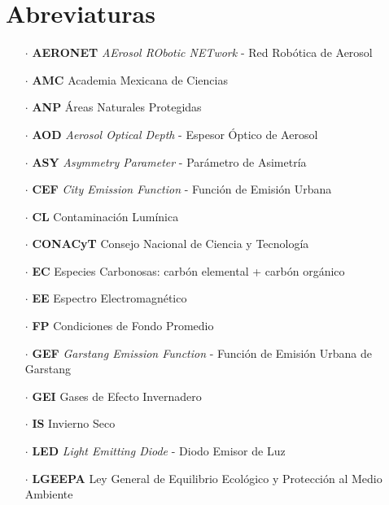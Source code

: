 \chapter{Abreviaturas}

\begin{itemize}

\item[$\cdot$] \textbf{AERONET} \textit{AErosol RObotic NETwork} - Red Robótica de Aerosol

\item[$\cdot$] \textbf{AMC} Academia Mexicana de Ciencias

\item[$\cdot$] \textbf{ANP} Áreas Naturales Protegidas

\item[$\cdot$] \textbf{AOD} \textit{Aerosol Optical Depth} - Espesor Óptico de Aerosol

\item[$\cdot$] \textbf{ASY} \textit{Asymmetry Parameter} - Parámetro de Asimetría

\item[$\cdot$] \textbf{CEF} \textit{City Emission Function} - Función de Emisión Urbana

\item[$\cdot$] \textbf{CL} Contaminación Lumínica

\item[$\cdot$] \textbf{CONACyT} Consejo Nacional de Ciencia y Tecnología

\item[$\cdot$] \textbf{EC} Especies Carbonosas: carbón elemental + carbón orgánico

\item[$\cdot$] \textbf{EE} Espectro Electromagnético

\item[$\cdot$] \textbf{FP} Condiciones de Fondo Promedio

\item[$\cdot$] \textbf{GEF} \textit{Garstang Emission Function} - Función de Emisión Urbana de Garstang

\item[$\cdot$] \textbf{GEI} Gases de Efecto Invernadero

\item[$\cdot$] \textbf{IS} Invierno Seco

\item[$\cdot$] \textbf{LED} \textit{Light Emitting Diode} - Diodo Emisor de Luz

\item[$\cdot$] \textbf{LGEEPA} Ley General de Equilibrio Ecológico y Protección al Medio Ambiente


\end{itemize}
